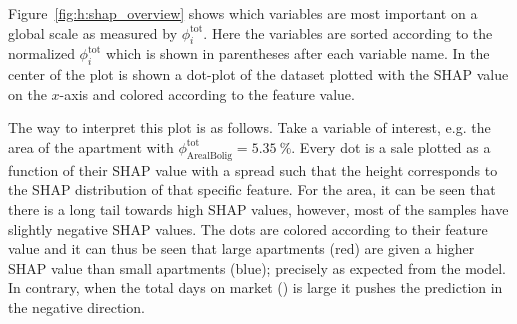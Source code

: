 Figure~\ref{fig:h:shap_overview} shows which variables are most important on a global scale as measured by $\phi_i^\mathrm{tot}$. Here the variables are sorted according to the normalized $\phi_i^\mathrm{tot}$ which is shown in parentheses after each variable name. In the center of the plot is shown a dot-plot of the dataset plotted with the SHAP value on the $x$-axis and colored according to the feature value. 

The way to interpret this plot is as follows. Take a variable of interest, e.g. the area of the apartment  with $\phi_\mathrm{ArealBolig}^\mathrm{tot}=\SI{5.35}{\percent}$. Every dot is a sale plotted as a function of their SHAP value with a spread such that the height corresponds to the SHAP distribution of that specific feature. For the area, it can be seen that there is a long tail towards high SHAP values, however, most of the samples have slightly negative SHAP values. The dots are colored according to their feature value and it can thus be seen that large apartments (red) are given a higher SHAP value than small apartments (blue); precisely as expected from the model. In contrary, when the total days on market () is large it pushes the prediction in the negative direction. 

